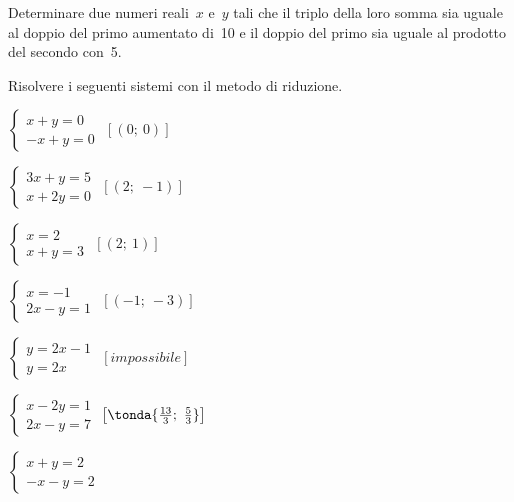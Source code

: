 \begin{esercizio}
 \label{ese:22.15}
Determinare due numeri reali~\(x\) e~\(y\) tali che il
triplo della loro somma sia uguale al doppio del primo aumentato di~10
e il doppio del primo sia uguale al prodotto del secondo con~5.
 \end{esercizio}


 \begin{esercizio}[\Ast]
 \label{ese:22.20}
Risolvere i seguenti sistemi con il metodo di riduzione.

\begin{multicols}{2}
 \begin{enumeratea}
 \item \(\left\{\begin{array}{l}x+y=0\\-x+y=0\end{array}\right.\)
 \hfill \(\left[(0;~0)\right]\)
\item \(\left\{\begin{array}{l}3x+y=5\\x+2y=0\end{array}\right.\)
 \hfill \(\left[(2;~-1)\right]\)
\item \(\left\{\begin{array}{l}x=2\\x+y=3\end{array}\right.\)
 \hfill \(\left[(2;~1)\right]\)
\item \(\left\{\begin{array}{l}x=-1\\2x-y=1\end{array}\right.\)
 \hfill \(\left[(-1;~-3)\right]\)
 \item \(\left\{\begin{array}{l}y=2x-1\\y=2x\end{array}\right.\)
 \hfill \(\left[impossibile\right]\)
\item \(\left\{\begin{array}{l}x-2y=1\\2x-y=7\end{array}\right.\)
 \hfill \(\left[\tonda{\frac{13}{3};~\frac{5}{3}}\right]\)
\item \(\left\{\begin{array}{l}x+y=2\\-x-y=2\end{array}\right.\)

\end{enumeratea}
\end{multicols}
\end{esercizio}
